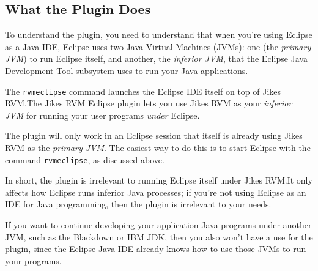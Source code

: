 \subsection{What the Plugin Does}

To understand the plugin, you need to understand that when you're
using Eclipse as a Java IDE, Eclipse uses two Java Virtual Machines
(JVMs): one (the {\em primary JVM}) to run Eclipse itself, and
another, the {\em inferior JVM}, that the Eclipse Java Development
Tool subsystem uses to run your Java applications.

The {\tt rvmeclipse} command launches the Eclipse IDE itself on top of
Jikes RVM.\@  The Jikes RVM Eclipse plugin lets you use Jikes RVM as
your {\em inferior JVM} for running your user programs {\em under} Eclipse.

The plugin will only work in an Eclipse session that itself is already
using Jikes RVM as the {\em primary JVM}.  The easiest way to do this
is to start Eclipse with the command {\tt rvmeclipse}, as discussed
above.

In short, the plugin is irrelevant to running Eclipse itself under
Jikes RVM.\@  It only affects how Eclipse runs inferior Java processes;
if you're not using Eclipse as an IDE for Java programming, then
the plugin is irrelevant to your needs.

If you want to continue developing your application Java programs
under another JVM, such as the Blackdown or IBM JDK, then you also
won't have a use for the plugin, since the Eclipse Java IDE already
knows how to use those JVMs to run your programs.

